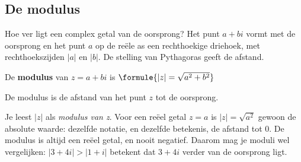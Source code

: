 \begin{oefeningen}
\end{oefeningen}

\subsection{De modulus}

Hoe ver ligt een complex getal van de oorsprong? Het punt $a + bi$ vormt met de oorsprong en het punt $a$ op de reële as een rechthoekige driehoek, met rechthoekszijden $|a|$ en $|b|$. De stelling van Pythagoras geeft de afstand.

\begin{theorie}
\begin{minipage}[t]{.6\linewidth}
\vspace{0pt}
De \textbf{\textcolor{accent}{modulus}} van $z = a + bi$ is \quad $\formule{|z| = \sqrt{a^2 + b^2}}$

\vspace{1mm}
De modulus is de afstand van het punt $z$ tot de oorsprong.
\end{minipage}\hfill
\begin{minipage}[t]{.36\linewidth}
\vspace{0pt}
\end{minipage}
\end{theorie}

Je leest $|z|$ als \textit{modulus van z}. Voor een reëel getal $z = a$ is $|z| = \sqrt{a^2}$ gewoon de absolute waarde: dezelfde notatie, en dezelfde betekenis, de afstand tot 0. De modulus is altijd een reëel getal, en nooit negatief. Daarom mag je moduli wel vergelijken: $|3 + 4i| > |1 + i|$ betekent dat $3 + 4i$ verder van de oorsprong ligt.

